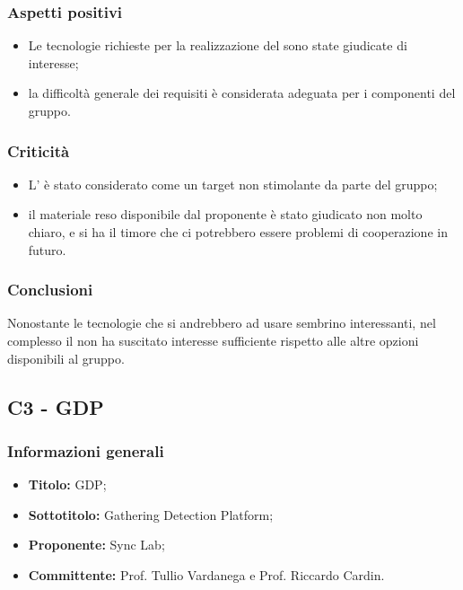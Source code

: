\documentclass[]{article}
\begin{document}
			\subsubsection{Aspetti positivi}
			\begin{itemize}
				\item Le tecnologie richieste per la realizzazione del  sono state giudicate di interesse;
				\item la difficoltà generale dei requisiti è considerata adeguata per i componenti del gruppo.
			\end{itemize}

			\subsubsection{Criticità}
			\begin{itemize}
			    \item L' è stato considerato come un target non stimolante da parte del gruppo;
				\item il materiale reso disponibile dal proponente è stato giudicato non molto chiaro, e si ha il timore che ci potrebbero essere problemi di cooperazione in futuro.
			\end{itemize}

			\subsubsection{Conclusioni}
			Nonostante le tecnologie che si andrebbero ad usare sembrino interessanti, nel complesso il  non ha suscitato interesse sufficiente rispetto alle altre opzioni disponibili al gruppo.

		\newpage

		\subsection{C3 - GDP}
		\subsubsection{Informazioni generali}
		\begin{itemize}
			\item \textbf{Titolo:} GDP;
			\item \textbf{Sottotitolo:} Gathering Detection Platform;
			\item \textbf{Proponente:} Sync Lab;
			\item \textbf{Committente:} Prof. Tullio Vardanega e Prof. Riccardo Cardin.
		\end{itemize}
\end{document}
